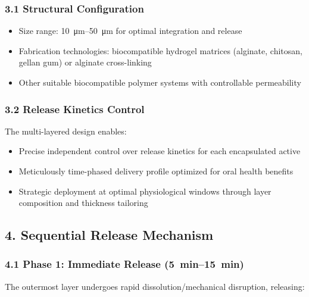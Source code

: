 \documentclass[12pt]{article}
\begin{document}
\subsubsection*{3.1 Structural Configuration}
\begin{itemize}
    \item Size range: \SIrange{10}{50}{\micro\meter} for optimal integration and release
    \item Fabrication technologies: biocompatible hydrogel matrices (alginate, chitosan, gellan gum) or alginate cross-linking
    \item Other suitable biocompatible polymer systems with controllable permeability
\end{itemize}

\subsubsection*{3.2 Release Kinetics Control}
The multi-layered design enables:
\begin{itemize}
    \item Precise independent control over release kinetics for each encapsulated active
    \item Meticulously time-phased delivery profile optimized for oral health benefits
    \item Strategic deployment at optimal physiological windows through layer composition and thickness tailoring
\end{itemize}

\subsection*{4. Sequential Release Mechanism}

\subsubsection*{4.1 Phase 1: Immediate Release (\SIrange{5}{15}{\minute})}
The outermost layer undergoes rapid dissolution/mechanical disruption, releasing:
\end{document}
